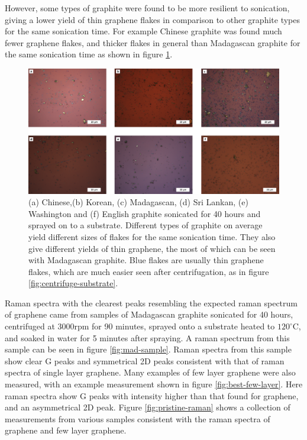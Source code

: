 \documentclass[12pt,titlepage]{article}
\begin{document}
	
	However, some types of graphite were found to be more resilient to sonication, giving a lower yield of thin graphene flakes in comparison to other graphite types for the same sonication time. For example Chinese graphite was found much fewer graphene flakes, and thicker flakes in general than Madagascan graphite for the same sonication time as shown in figure \ref{fig:flake-type}.

	\begin{figure}
		\centering
		\includegraphics[width=1\textwidth]{figures/flake-type.png}
		\caption[Comparison of graphite sources with the same sonication time.]{(a) Chinese,(b) Korean, (c) Madagascan, (d) Sri Lankan, (e) Washington and (f) English graphite sonicated for 40 hours and sprayed on to a substrate. Different types of graphite on average yield different sizes of flakes for the same sonication time. They also give different yields of thin graphene, the most of which can be seen with Madagascan graphite. Blue flakes are usually thin graphene flakes, which are much easier seen after centrifugation, as in figure \ref{fig:centrifuge-substrate}.}
		\label{fig:flake-type}
	\end{figure}
		
	Raman spectra with the clearest peaks resembling the expected raman spectrum of graphene came from samples of Madagascan graphite sonicated for 40 hours, centrifuged at 3000rpm for 90 minutes, sprayed onto a substrate heated to $120^{\circ}$C, and soaked in water for 5 minutes after spraying. A raman spectrum from this sample can be seen in figure \ref{fig:mad-sample}. Raman spectra from this sample show clear G peaks and symmetrical 2D peaks consistent with that of raman spectra of single layer graphene. Many examples of few layer graphene were also measured, with an example measurement shown in figure \ref{fig:best-few-layer}. Here raman spectra show G peaks with intensity higher than that found for graphene, and an asymmetrical 2D peak. Figure \ref{fig:pristine-raman} shows a collection of measurements from various samples consistent with the raman spectra of graphene and few layer graphene.
	
\end{document}
